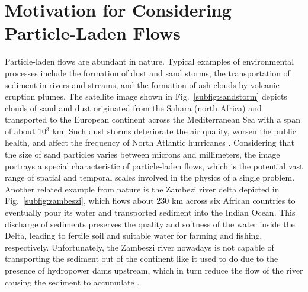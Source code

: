 
\section{Motivation for Considering Particle-Laden Flows}
\label{sec:motiv}

Particle-laden flows are abundant in nature. Typical examples of
environmental processes include the formation of dust and sand storms,
the transportation of sediment in rivers and streams, and the
formation of ash clouds by volcanic eruption plumes. The satellite
image shown in Fig.~\ref{subfig:sandstorm} depicts clouds of sand and
dust originated from the Sahara (north Africa) and transported to the
European continent across the Mediterranean Sea with a span of about
10$^3$ km.  Such dust storms deteriorate the air quality, worsen the
public health, and affect the frequency of North Atlantic hurricanes
\citep{clifford2019}. Considering that the size of sand particles
varies between microns and millimeters, the image portrays a special
characteristic of particle-laden flows, which is the potential vast
range of spatial and temporal scales involved in the physics of a
single problem.  Another related example from nature is the Zambezi
river delta depicted in Fig.~\ref{subfig:zambeszi}, which flows about
230 km across six African countries to eventually pour its water and
transported sediment into the Indian Ocean. This discharge of
sediments preserves the quality and softness of the water inside the
Delta, leading to fertile soil and suitable water for farming and
fishing, respectively.  Unfortunately, the Zambeszi river nowadays is
not capable of transporting the sediment out of the continent like it
used to do due to the presence of hydropower dams upstream, which in
turn reduce the flow of the river causing the sediment to accumulate
\citep{disskunz2011effect}.

